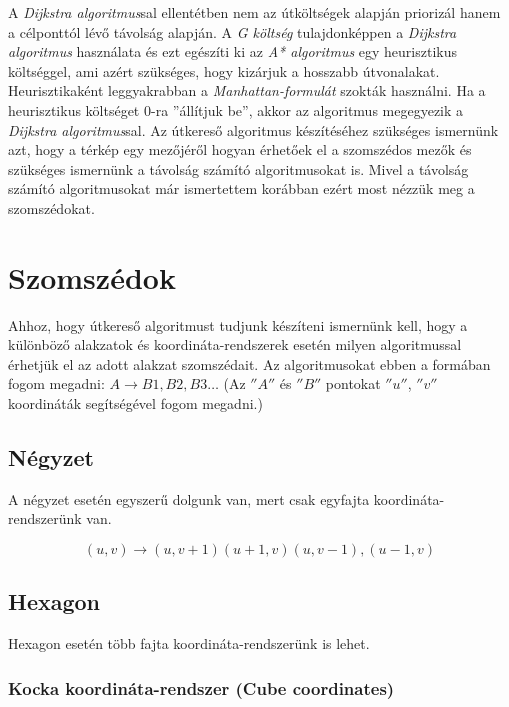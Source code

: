 \noindent A \textit{Dijkstra algoritmus}sal ellentétben nem az útköltségek alapján priorizál hanem a célponttól lévő távolság alapján.
\newline
\newline A \textit{G költség} tulajdonképpen a \textit{Dijkstra algoritmus} használata és ezt egészíti ki az \textit{A* algoritmus} egy heurisztikus költséggel, ami azért szükséges, hogy kizárjuk a hosszabb útvonalakat. Heurisztikaként leggyakrabban a \textit{Manhattan-formulát} szokták használni. Ha a heurisztikus költséget 0-ra ''állítjuk be'', akkor az algoritmus megegyezik a \textit{Dijkstra algoritmus}sal.
\newline
\newline Az útkereső algoritmus készítéséhez szükséges ismernünk azt, hogy a térkép egy mezőjéről hogyan érhetőek el a szomszédos mezők és szükséges ismernünk a távolság számító algoritmusokat is. Mivel a távolság számító algoritmusokat már ismertettem korábban ezért most nézzük meg a szomszédokat.

\section{Szomszédok}

Ahhoz, hogy útkereső algoritmust tudjunk készíteni ismernünk kell, hogy a különböző alakzatok és koordináta-rendszerek esetén milyen algoritmussal érhetjük el az adott alakzat szomszédait. 
\newline
\newline Az algoritmusokat ebben a formában fogom megadni: $A \rightarrow B1, B2, B3 …$
(Az $''A''$ és $''B''$ pontokat $''u''$, $''v''$ koordináták segítségével fogom megadni.)

\subsection{Négyzet}
A négyzet esetén egyszerű dolgunk van, mert csak egyfajta koordináta-rendszerünk van.

$$
(u,v) \rightarrow (u,v+1) (u+1,v) (u,v-1), (u-1,v)
$$

\subsection{Hexagon}

Hexagon esetén több fajta koordináta-rendszerünk is lehet.

\subsubsection{Kocka koordináta-rendszer (Cube coordinates)}

